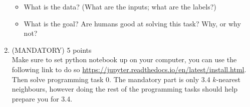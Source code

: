 \documentclass[]{scrartcl}
\begin{document}
\begin{enumerate}
	\begin{itemize}
	\item What is the data? (What are the inputs; what are the labels?)
	\item What is the goal? Are humans good at solving this task? Why, or why not?
	\end{itemize}
\item (MANDATORY) 5 points\\
Make sure to set python notebook up on your computer, you can use the following link to do so \url{https://jupyter.readthedocs.io/en/latest/install.html}. Then solve programming task 0. The mandatory part is only 3.4 $k$-nearest neighbours, however doing the rest of the programming tasks should help prepare you for 3.4.
\end{enumerate}
\end{document}

